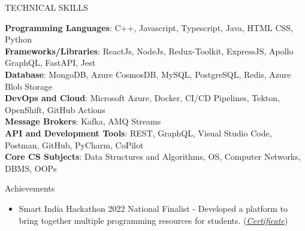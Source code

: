 \documentclass{resume} %
\begin{document}
\begin{rSection}{TECHNICAL SKILLS}




\textbf{Programming Languages}: {\normalfont C++, Javascript, Typescript, Java, HTML CSS, Python}
\\
\textbf{Frameworks/Libraries}: {\normalfont ReactJs, NodeJs, Redux-Toolkit, ExpressJS, Apollo GraphQL, FastAPI, Jest}
 \\
 \textbf{Database}: {\normalfont MongoDB, Azure CosmosDB, MySQL, PostgreSQL, Redis, Azure Blob Storage}
 \\
 \textbf{DevOps and Cloud}: {\normalfont Microsoft Azure, Docker, CI/CD Pipelines, Tekton, OpenShift, GitHub Actions}
 \\
 \textbf{Message Brokers}: {\normalfont Kafka, AMQ Streams}  
 \\
 \textbf{API and Development Tools}: {\normalfont REST, GraphQL, Visual Studio Code, Postman, GitHub, PyCharm, CoPilot}
\\ \textbf{Core CS Subjects}: {\normalfont Data Structures and Algorithms, OS, Computer Networks, DBMS, OOPs}
\end{rSection}


\begin{rSection}{Achievements}

\begin{itemize}
   \item {Smart India Hackathon 2022 National Finalist} - {\normalfont Developed a platform to bring together multiple programming resources for students. }{\normalfont (\href{https://drive.google.com/file/d/1No-u1sUaclG-nf7_Gtym5JDEz1ydyRSL/view?usp=sharing}{\emph{Certificate}})}

\end{itemize}
\end{rSection}





\end{document}
